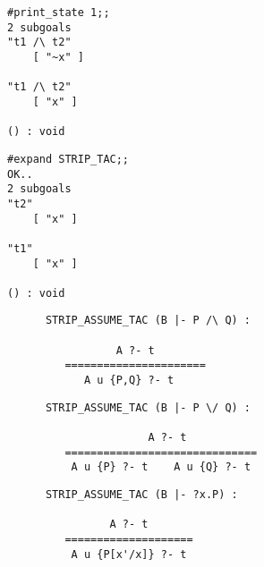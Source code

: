 
\vskip4mm
\begin{session}\begin{verbatim}
#print_state 1;;
2 subgoals
"t1 /\ t2"
    [ "~x" ]

"t1 /\ t2"
    [ "x" ]

() : void
\end{verbatim}\end{session}

\vskip 4mm
\begin{session}\begin{verbatim}
#expand STRIP_TAC;;
OK..
2 subgoals
"t2"
    [ "x" ]

"t1"
    [ "x" ]

() : void
\end{verbatim}\end{session}





\vskip3mm
{\Large\begin{verbatim}
      STRIP_ASSUME_TAC (B |- P /\ Q) :
   
                 A ?- t
         ======================  
            A u {P,Q} ?- t
\end{verbatim}}

\vskip3mm
{\Large\begin{verbatim}
      STRIP_ASSUME_TAC (B |- P \/ Q) :

                      A ?- t
         ==============================  
          A u {P} ?- t    A u {Q} ?- t
\end{verbatim}}

\vskip3mm
{\Large\begin{verbatim}
      STRIP_ASSUME_TAC (B |- ?x.P) :

                A ?- t
         ====================  
          A u {P[x'/x]} ?- t
\end{verbatim}}



